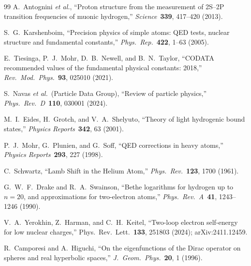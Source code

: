 \documentclass[11pt]{article}
\begin{document}
\begin{thebibliography}{99}
A.~Antognini \textit{et al.}, ``Proton structure from the measurement
of 2S--2P transition frequencies of muonic hydrogen,''
\textit{Science}\ \textbf{339}, 417--420 (2013).

S.~G.~Karshenboim, ``Precision physics of simple atoms: QED tests,
nuclear structure and fundamental constants,''
\textit{Phys.\ Rep.}\ \textbf{422}, 1--63 (2005).

E.~Tiesinga, P.~J.~Mohr, D.~B.~Newell, and B.~N.~Taylor, ``CODATA
recommended values of the fundamental physical constants: 2018,''
\textit{Rev.\ Mod.\ Phys.}\ \textbf{93}, 025010 (2021).

S.~Navas \textit{et al.}\ (Particle Data Group), ``Review of particle
physics,'' \textit{Phys.\ Rev.\ D}\ \textbf{110}, 030001 (2024).

M.~I.~Eides, H.~Grotch, and V.~A.~Shelyuto, ``Theory of light
hydrogenic bound states,''
\textit{Physics Reports}\ \textbf{342}, 63 (2001).

P.~J.~Mohr, G.~Plunien, and G.~Soff, ``QED corrections in heavy
atoms,'' \textit{Physics Reports}\ \textbf{293}, 227 (1998).

C.~Schwartz, ``Lamb Shift in the Helium Atom,''
\textit{Phys.\ Rev.}\ \textbf{123}, 1700 (1961).

G.~W.~F.~Drake and R.~A.~Swainson, ``Bethe logarithms for hydrogen
up to $n=20$, and approximations for two-electron atoms,''
\textit{Phys.\ Rev.\ A}\ \textbf{41}, 1243--1246 (1990).

V.~A.~Yerokhin, Z.~Harman, and C.~H.~Keitel,
``Two-loop electron self-energy for low nuclear charges,''
Phys.\ Rev.\ Lett.\ \textbf{133}, 251803 (2024); arXiv:2411.12459.

R.~Camporesi and A.~Higuchi, ``On the eigenfunctions of the Dirac
operator on spheres and real hyperbolic spaces,''
\textit{J.\ Geom.\ Phys.}\ \textbf{20}, 1 (1996).

\end{thebibliography}
\end{document}
